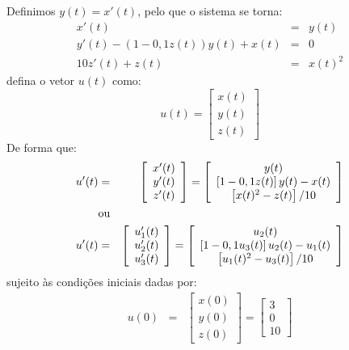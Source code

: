 \begin{resol}
 Definimos $y(t)=x'(t)$, pelo que o sistema se torna:
\begin{eqnarray}
x'(t)&=&y(t)\\
y'(t)-(1- 0,1 z(t))y(t)+ x(t)&=&0\\
10 z'(t)+z(t)&=&x(t)^2
\end{eqnarray}
 defina o vetor $u(t)$ como:
\begin{equation}u(t)=\left[
\begin{array}{c}
 x(t)\\y(t)\\z(t)
\end{array}
\right]\end{equation}
De forma que:
\begin{eqnarray}
u'(t)&=&\left[
\begin{array}{c}
 x'(t)\\y'(t)\\z'(t)
\end{array}
\right]=\left[
\begin{array}{c}
 y(t)\\
 \left[1- 0,1 z(t)\right]y(t)- x(t)\\
 \left[x(t)^2-z(t)\right]/10
\end{array}
\right]\\
&\hbox{ou}&\\
u'(t)&=&\left[
\begin{array}{c}
 u_1'(t)\\u_2'(t)\\u_3'(t)
\end{array}
\right]=\left[
\begin{array}{c}
 u_2(t)\\
 \left[1- 0,1 u_3(t)\right]u_2(t)- u_1(t)\\
 \left[u_1(t)^2-u_3(t)\right]/10
\end{array}
\right]
\end{eqnarray}
sujeito às condições iniciais dadas por:
\begin{eqnarray}
u(0)&=&\left[
\begin{array}{c}
 x(0)\\y(0)\\z(0)
\end{array}
\right]=\left[
\begin{array}{c}
3\\0\\10
\end{array}
\right]
\end{eqnarray}

\end{resol}


